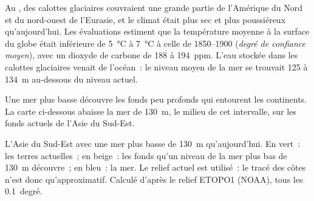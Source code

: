 Au , des calottes glaciaires couvraient une grande
partie de l'Amérique du Nord et du nord-ouest de l'Eurasie, et le climat
était plus sec et plus poussiéreux qu'aujourd'hui. Les évaluations
estiment que la température moyenne à la surface du globe était inférieure
de \qty{5}{\degreeCelsius} à \qty{7}{\degreeCelsius} à celle de 1850--1900
(\emph{degré de confiance moyen}), avec un dioxyde de carbone de 188 à
\qty{194}{ppm}. L'eau stockée dans les calottes glaciaires venait de
l'océan~: le niveau moyen de la mer se trouvait 125 à \qty{134}{m}
au-dessous du niveau actuel.

Une mer plus basse découvre les fonds peu profonds qui entourent les
continents. La carte ci-dessous abaisse la mer de \qty{130}{m}, le milieu
de cet intervalle, sur les fonds actuels de l'Asie du Sud-Est.

\begin{omfigure}

{\small L'Asie du Sud-Est avec une mer plus basse de \qty{130}{m}
qu'aujourd'hui. En vert~: les terres actuelles~; en beige~: les fonds
qu'un niveau de la mer plus bas de \qty{130}{m} découvre~; en bleu~: la
mer. Le relief actuel est utilisé~: le tracé des côtes n'est donc
qu'approximatif. Calculé d'après le relief ETOPO1 (NOAA), tous les
0.1~degré.}
\end{omfigure}

